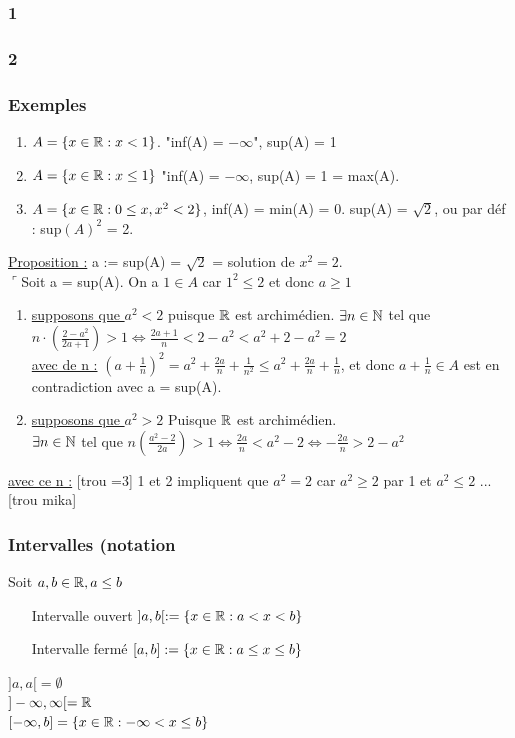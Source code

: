 \documentclass[12pt,a4paper]{article}
\begin{document}
\subsubsection{1}
\subsubsection{2}
\subsubsection{Exemples}
\begin{enumerate}
\item $A = \{x \in \mathbb{R} : x < 1\}$. "inf(A) = $-\infty$", sup(A) = 1
\item $A = \{x \in \mathbb{R} : x \leq 1\}$ "inf(A) = $-\infty$, sup(A) = 1 = max(A).
\item $A = \{x \in \mathbb{R} : 0 \leq x, x ^2 < 2\}$, inf(A) = min(A) = 0. sup(A) = $\sqrt{2}$, ou par déf : sup$(A)^2$ = 2.
\end{enumerate}
\underline{Proposition :} a := sup(A) = $\sqrt{2}$ = solution de $x^2 = 2$.\\
$\ulcorner$Soit a = sup(A). On a $1 \in A$ car $1^2 \leq 2$ et donc $a \geq 1$
\begin{enumerate}
\item \underline{supposons que $a^2 < 2$} puisque $\mathbb{R}$ est archimédien. $\exists n \in \mathbb{N}$ tel que $n \cdot (\frac{2-a^2}{2a+1}) > 1 \Leftrightarrow \frac{2a+1}{n} < 2-a^2 < a^2 + 2 - a^2 = 2$\\
\underline{avec de n :} $(a + \frac{1}{n})^2 = a^2 + \frac{2a}{n} + \frac{1}{n^2} \leq a^2 + \frac{2a}{n} + \frac{1}{n}$, et donc $a + \frac{1}{n} \in A$ est en contradiction avec a = sup(A).
\item \underline{supposons que $a^2 > 2$} Puisque $\mathbb{R}$ est archimédien.\\
$\exists n \in \mathbb{N}$ tel que $ n (\frac{a^2 -2}{2a}) > 1 \Leftrightarrow \frac{2a}{n} < a^2 -2 \Leftrightarrow -\frac{2a}{n} > 2-a^2$
\end{enumerate}
\underline{avec ce n :} [trou =3]
1 et 2 impliquent que $a^2 = 2$ car $a^2 \geq 2$ par 1 et $a^2 \leq 2$ ...[trou mika]
\subsubsection{Intervalles (notation}
Soit $a, b \in \mathbb{R}, a \leq b$
\begin{itemize}
\item[Intervalle ouvert] $]a,b[ := \{x \in \mathbb{R} : a < x < b\}$
\item[Intervalle fermé] $[a,b] := \{x \in \mathbb{R} : a \leq x \leq b\}$
\end{itemize}
$]a,a[ = \emptyset$ \\ $]-\infty, \infty[ = \mathbb{R}$ \\ $[-\infty, b] = \{x \in \mathbb{R} : -\infty < x \leq b\}$
\end{document}
